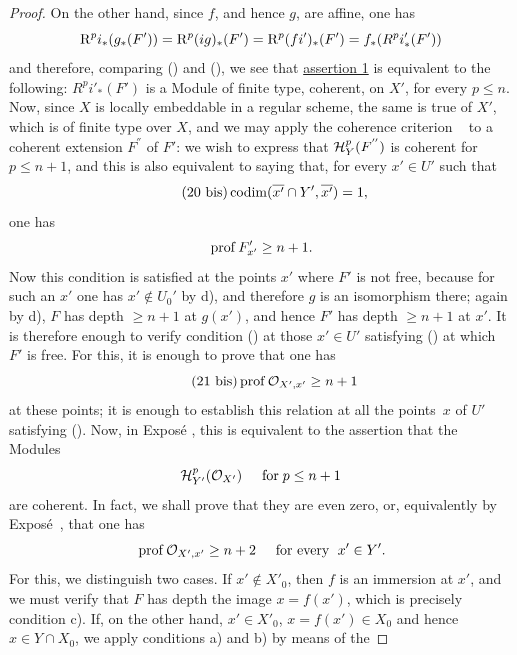 \begin{proof}
On the other hand, since $f$, and hence $g$, are affine, one has
\steco
\begin{equation} \label{eq:XII.20} {}\mathrm R^pi_\ast(g_\ast(F')) = \mathrm R^p(ig)_\ast(F') = \mathrm R^p(fi')_\ast(F') = f_\ast(R^pi'_\ast(F'))
\end{equation}
and therefore, comparing () and (), we see that \hyperref[XII.4.1]{assertion 1}\sisi{${}^\circ$}{} is equivalent to the following: $R^pi'_\ast(F')$ is a Module of finite type, \ie coherent, on $X'$, for every $p\leq n$. Now, since $X$ is locally embeddable in a regular scheme, the same is true of $X'$, which is of finite type over $X$, and we may apply the coherence criterion ~ to a coherent extension $F^{''}$ of $F'$: we wish to express that $\mathcal H^p_Y(F^{''})$ is coherent for $p\leq n+1$, and this is also equivalent to saying that, for every $x'\in U'$ such that
\begin{equation*} \label{eq:XII.20bis} \tag{20 bis} {}\operatorname{codim} (\overline{x'}\cap Y', \overline{x'})=1,
\end{equation*}
one has
\steco
\begin{equation} \label{eq:XII.21} {} \operatorname{prof} F'_{x'}\geq n+1.
\end{equation}
Now this condition is satisfied at the points $x'$ where $F'$ is not free, because for such an $x'$ one has $x'\notin U_0'$ by d), and therefore $g$ is an isomorphism there; again by d), $F$ has depth $\geq n+1$ at $g(x')$, and hence $F'$ has depth $\geq n+1$ at $x'$. It is therefore enough to verify condition () at those $x'\in U'$ satisfying () at which $F'$ is free. For this, it is enough to prove that one has\pageoriginale
\begin{equation*} \label{eq:XII.21bis} \tag{21 bis}
\operatorname{prof} \mathcal O_{X', x'}\geq n+1
\end{equation*}
\enlargethispage{\baselineskip}%
at these points; \afortiori it is enough to establish this relation at all the points~$x$ of $U'$ satisfying (). Now,  in Expos\'e , this is equivalent to the assertion that the Modules
\[
\mathcal H^p_{Y'}(\mathcal O_{X'}) \hspace{5mm} \text{for} \; p\leq n+1
\]
are coherent. In fact, we shall prove that they are even zero, or, equivalently by Expos\'e~, that one has
\steco
\begin{equation} \label{eq:XII.22} {} \operatorname{prof} \mathcal O_{X', x'}\geq n+2 \hspace{5mm} \text{for every }\; x'\in Y'.
\end{equation}
For this, we distinguish two cases. If $x'\notin X'_0$, then $f$ is an immersion at $x'$, and we must verify that $F$ has depth  the image $x=f(x')$, which is precisely condition c). If, on the other hand, $x'\in X'_0$, \ie $x=f(x')\in X_0$ and hence $x\in Y\cap X_0$, we apply conditions a) and b) by means of the


\end{proof}
